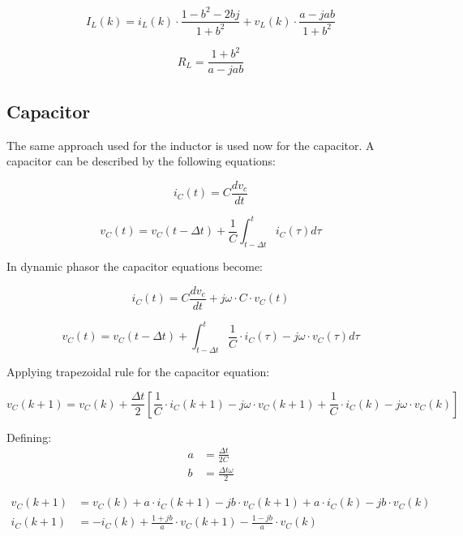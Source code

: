 \begin{equation}
	I_L(k) = i_L(k) \cdot \frac{1-b^2-2bj}{1+b^2} + v_L(k) \cdot \frac{a-jab}{1+b^2}
\end{equation}

\begin{equation}
	R_L = \frac{1+b^2}{a-jab}
\end{equation}	


\subsection{Capacitor}

The same approach used for the inductor is used now for the capacitor.
A capacitor can be described by the following equations:

\begin{equation}
	i_C(t)= C \frac{d v_c}{dt}
\end{equation}

\begin{equation}
	v_C(t)= v_C(t - \Delta t) + \frac{1}{C} \int_{t - \Delta t}^{t} i_C (\tau) d \tau
\end{equation}

In dynamic phasor the capacitor equations become:

\begin{equation}
        i_C(t)= C \frac{d v_c}{dt} + j \omega \cdot C \cdot v_C(t)
\end{equation}

\begin{equation}
        v_C(t) = v_C(t- \Delta t) +  \int_{t- \Delta t}^{t} \frac{1}{C} \cdot i_C(\tau) -j \omega \cdot v_C(\tau)d \tau 
\end{equation}

Applying trapezoidal rule for the capacitor equation:

\begin{equation}
        v_C(k+1) = v_C(k) + \frac{\Delta t}{2} \left[ \frac{1}{C} \cdot i_C(k+1) - j \omega \cdot v_C(k+1) + \frac{1}{C} \cdot i_C(k) - j \omega \cdot v_C(k) \right]
\end{equation}

Defining:
\begin{align}
        a &= \frac{\Delta t}{2C} \\
        b &= \frac{\Delta t \omega}{2}
\end{align}

\begin{align}
        v_C(k+1) &= v_C(k) + a \cdot i_C(k+1) - j b \cdot v_C(k+1) + a \cdot i_C(k) - j b \cdot v_C(k) \\
        i_C(k+1) &= -i_C(k) + \frac{1+jb}{a} \cdot v_C(k+1) - \frac{1-jb}{a} \cdot v_C(k)
\end{align}

